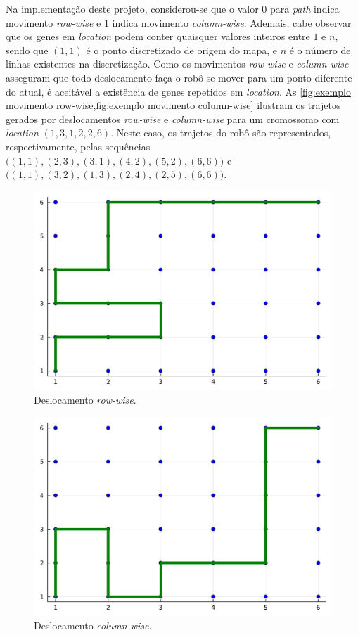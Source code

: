 \sloppy Na implementação deste projeto, considerou-se que o valor 0 para \emph{path} indica movimento \emph{row-wise} e 1 indica movimento \emph{column-wise}. Ademais, cabe observar que os genes em \emph{location} podem conter quaisquer valores inteiros entre $1$ e $n$, sendo que $(1, 1)$ é o ponto discretizado de origem do mapa, e $n$ é o número de linhas existentes na discretização. Como os movimentos \emph{row-wise} e \emph{column-wise} asseguram que todo deslocamento faça o robô se mover para um ponto diferente do atual, é aceitável a existência de genes repetidos em \emph{location}. As \cref{fig:exemplo movimento row-wise,fig:exemplo movimento column-wise} ilustram os trajetos gerados por deslocamentos \emph{row-wise} e \emph{column-wise} para um cromossomo com \emph{location} $(1, 3, 1, 2, 2, 6)$. Neste caso, os trajetos do robô são representados, respectivamente, pelas sequências $\big((1, 1), (2, 3), (3, 1), (4, 2), (5, 2), (6, 6)\big)$ e $\big((1, 1), (3, 2), (1, 3), (2, 4), (2, 5), (6, 6)\big)$.

\begin{figure}[ht]
    \centering
    \includegraphics[scale=0.6]{images/movimento_tipo_linha.pdf}
    \caption{Deslocamento \emph{row-wise}.}
    \label{fig:exemplo movimento row-wise}
\end{figure}

\begin{figure}[ht]
    \centering
    \includegraphics[scale=0.6]{images/movimento_tipo_coluna.pdf}
    \caption{Deslocamento \emph{column-wise}.}
    \label{fig:exemplo movimento column-wise}
\end{figure}

